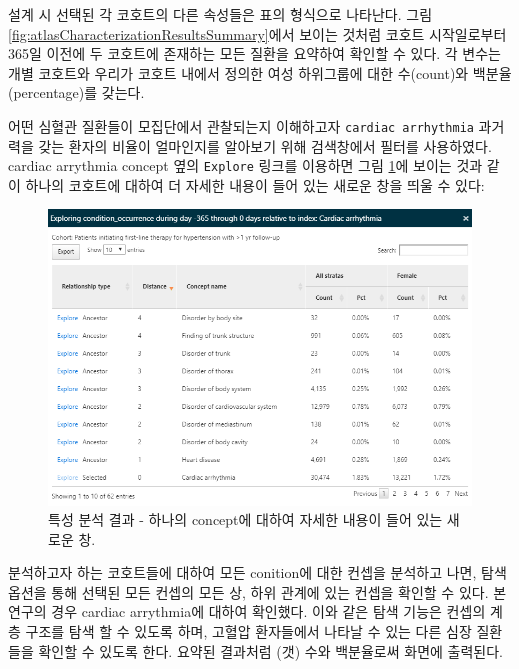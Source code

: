 \documentclass[11pt]{book}
\theoremstyle{definition}
\theoremstyle{definition}
\theoremstyle{definition}
\theoremstyle{remark}
\begin{document}
설계 시 선택된 각 코호트의 다른 속성들은 표의 형식으로 나타난다. 그림
\ref{fig:atlasCharacterizationResultsSummary}에서 보이는 것처럼 코호트
시작일로부터 365일 이전에 두 코호트에 존재하는 모든 질환을 요약하여
확인할 수 있다. 각 변수는 개별 코호트와 우리가 코호트 내에서 정의한 여성
하위그룹에 대한 수(count)와 백분율(percentage)를 갖는다.

어떤 심혈관 질환들이 모집단에서 관찰되는지 이해하고자
\texttt{cardiac\ arrhythmia} 과거력을 갖는 환자의 비율이 얼마인지를
알아보기 위해 검색창에서 필터를 사용하였다. cardiac arrythmia concept
옆의 \texttt{Explore} 링크를 이용하면 그림
\ref{fig:atlasCharacterizationResultsExplore}에 보이는 것과 같이 하나의
코호트에 대하여 더 자세한 내용이 들어 있는 새로운 창을 띄울 수 있다:

\begin{figure}

{\centering \includegraphics[width=1\linewidth]{images/Characterization/atlasCharacterizationResultsExplore} 

}

\caption{특성 분석 결과 - 하나의 concept에 대하여 자세한 내용이 들어 있는 새로운 창.}\label{fig:atlasCharacterizationResultsExplore}
\end{figure}

분석하고자 하는 코호트들에 대하여 모든 conition에 대한 컨셉을 분석하고
나면, 탐색 옵션을 통해 선택된 모든 컨셉의 모든 상, 하위 관계에 있는
컨셉을 확인할 수 있다. 본 연구의 경우 cardiac arrythmia에 대하여
확인했다. 이와 같은 탐색 기능은 컨셉의 계층 구조를 탐색 할 수 있도록
하며, 고혈압 환자들에서 나타날 수 있는 다른 심장 질환들을 확인할 수
있도록 한다. 요약된 결과처럼 (갯) 수와 백분율로써 화면에 출력된다.
\end{document}
